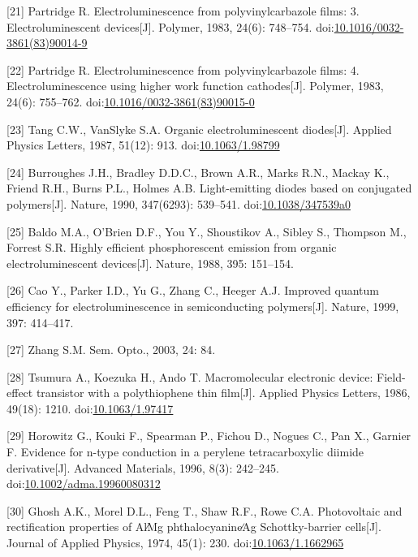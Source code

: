 \documentclass[12pt,]{report}
\begin{document}
{[}21{]} Partridge R. Electroluminescence from polyvinylcarbazole films:
3. Electroluminescent devices{[}J{]}. Polymer, 1983, 24(6): 748--754.
doi:\href{http://dx.doi.org/10.1016/0032-3861(83)90014-9}{10.1016/0032-3861(83)90014-9}

{[}22{]} Partridge R. Electroluminescence from polyvinylcarbazole films:
4. Electroluminescence using higher work function cathodes{[}J{]}.
Polymer, 1983, 24(6): 755--762.
doi:\href{http://dx.doi.org/10.1016/0032-3861(83)90015-0}{10.1016/0032-3861(83)90015-0}

{[}23{]} Tang C.W., VanSlyke S.A. Organic electroluminescent
diodes{[}J{]}. Applied Physics Letters, 1987, 51(12): 913.
doi:\href{http://dx.doi.org/10.1063/1.98799}{10.1063/1.98799}

{[}24{]} Burroughes J.H., Bradley D.D.C., Brown A.R., Marks R.N., Mackay
K., Friend R.H., Burns P.L., Holmes A.B. Light-emitting diodes based on
conjugated polymers{[}J{]}. Nature, 1990, 347(6293): 539--541.
doi:\href{http://dx.doi.org/10.1038/347539a0}{10.1038/347539a0}

{[}25{]} Baldo M.A., O'Brien D.F., You Y., Shoustikov A., Sibley S.,
Thompson M., Forrest S.R. Highly efficient phosphorescent emission from
organic electroluminescent devices{[}J{]}. Nature, 1988, 395: 151--154.

{[}26{]} Cao Y., Parker I.D., Yu G., Zhang C., Heeger A.J. Improved
quantum efficiency for electroluminescence in semiconducting
polymers{[}J{]}. Nature, 1999, 397: 414--417.

{[}27{]} Zhang S.M. Sem. Opto., 2003, 24: 84.

{[}28{]} Tsumura A., Koezuka H., Ando T. Macromolecular electronic
device: Field-effect transistor with a polythiophene thin film{[}J{]}.
Applied Physics Letters, 1986, 49(18): 1210.
doi:\href{http://dx.doi.org/10.1063/1.97417}{10.1063/1.97417}

{[}29{]} Horowitz G., Kouki F., Spearman P., Fichou D., Nogues C., Pan
X., Garnier F. Evidence for n-type conduction in a perylene
tetracarboxylic diimide derivative{[}J{]}. Advanced Materials, 1996,
8(3): 242--245.
doi:\href{http://dx.doi.org/10.1002/adma.19960080312}{10.1002/adma.19960080312}

{[}30{]} Ghosh A.K., Morel D.L., Feng T., Shaw R.F., Rowe C.A.
Photovoltaic and rectification properties of Al∕Mg phthalocyanine∕Ag
Schottky-barrier cells{[}J{]}. Journal of Applied Physics, 1974, 45(1):
230. doi:\href{http://dx.doi.org/10.1063/1.1662965}{10.1063/1.1662965}
\end{document}
